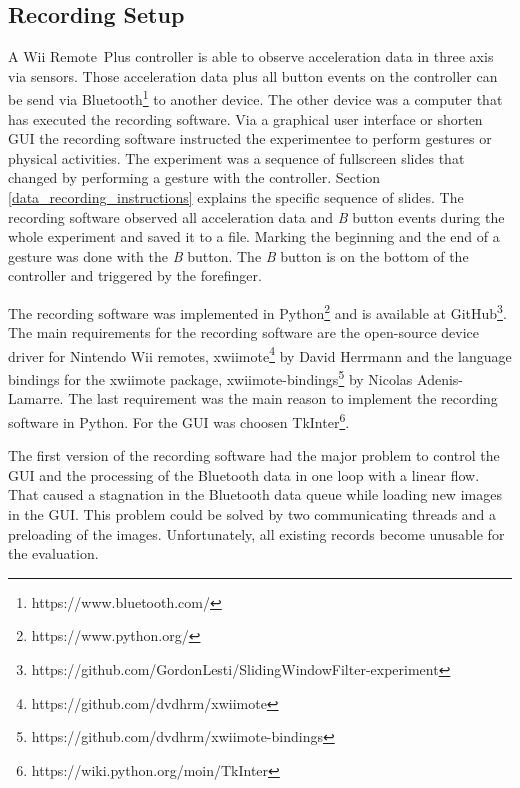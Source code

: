 \subsection{Recording Setup} \label{recording_setup}
A Wii Remote\texttrademark~Plus controller is able to observe acceleration data in three axis via sensors. Those
acceleration data plus all button events on the controller can be send via
Bluetooth\footnote{https://www.bluetooth.com/} to another device. The other device was a computer that has executed the
recording software. Via a graphical user interface or shorten GUI the recording software instructed the experimentee to
perform gestures or physical activities. The experiment was a sequence of fullscreen slides that changed by performing a
gesture with the controller. Section \ref{data_recording_instructions} explains the specific sequence of slides. The
recording software observed all acceleration data and \textit{B} button events during the whole experiment and saved it
to a file. Marking the beginning and the end of a gesture was done with the \textit{B} button. The \textit{B}
button is on the bottom of the controller and triggered by the forefinger.

The recording software was implemented in Python\footnote{https://www.python.org/} and is available at
GitHub\footnote{https://github.com/GordonLesti/SlidingWindowFilter-experiment}. The main requirements for the recording
software are the open-source device driver for Nintendo Wii remotes,
xwiimote\footnote{https://github.com/dvdhrm/xwiimote} by David Herrmann and the language bindings for the xwiimote
package, xwiimote-bindings\footnote{https://github.com/dvdhrm/xwiimote-bindings} by Nicolas Adenis-Lamarre. The last
requirement was the main reason to implement the recording software in Python. For the GUI was choosen
TkInter\footnote{https://wiki.python.org/moin/TkInter}.

The first version of the recording software had the major problem to control the GUI and the
processing of the Bluetooth data in one loop with a linear flow. That caused a stagnation in the Bluetooth data queue
while loading new images in the GUI. This problem could be solved by two communicating threads and a preloading of the
images. Unfortunately, all existing records become unusable for the evaluation.


